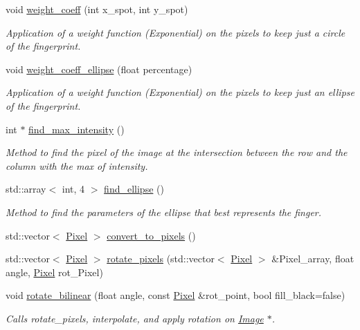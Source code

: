\begin{DoxyCompactItemize}
void \hyperlink{class_image_ae7249beaa8c989f37888ec3b2c444166}{weight\+\_\+coeff} (int x\+\_\+spot, int y\+\_\+spot)
\begin{DoxyCompactList}\small\item\em Application of a weight function (Exponential) on the pixels to keep just a circle of the fingerprint. \end{DoxyCompactList}\item 
void \hyperlink{class_image_a8d5d7d07ddaf59d0875b94e538f8429e}{weight\+\_\+coeff\+\_\+ellipse} (float percentage)
\begin{DoxyCompactList}\small\item\em Application of a weight function (Exponential) on the pixels to keep just an ellipse of the fingerprint. \end{DoxyCompactList}\item 
int $\ast$ \hyperlink{class_image_aebad8aed02315ffc5df4ec774b9b960d}{find\+\_\+max\+\_\+intensity} ()
\begin{DoxyCompactList}\small\item\em Method to find the pixel of the image at the intersection between the row and the column with the max of intensity. \end{DoxyCompactList}\item 
std\+::array$<$ int, 4 $>$ \hyperlink{class_image_aa85eb23026300e759e763ce312464632}{find\+\_\+ellipse} ()
\begin{DoxyCompactList}\small\item\em Method to find the parameters of the ellipse that best represents the finger. \end{DoxyCompactList}\item 
std\+::vector$<$ \hyperlink{class_pixel}{Pixel} $>$ \hyperlink{class_image_a04c8cb611e932e8b211fe9ca4473fe8c}{convert\+\_\+to\+\_\+pixels} ()
\item 
std\+::vector$<$ \hyperlink{class_pixel}{Pixel} $>$ \hyperlink{class_image_a1eaeac03912d7ec0e5a78e6e6035dc4f}{rotate\+\_\+pixels} (std\+::vector$<$ \hyperlink{class_pixel}{Pixel} $>$ \&Pixel\+\_\+array, float angle, \hyperlink{class_pixel}{Pixel} rot\+\_\+\+Pixel)
\item 
void \hyperlink{class_image_a64afdd661bf40ac0129227f8bf1daad1}{rotate\+\_\+bilinear} (float angle, const \hyperlink{class_pixel}{Pixel} \&rot\+\_\+point, bool fill\+\_\+black=false)
\begin{DoxyCompactList}\small\item\em Calls rotate\+\_\+pixels, interpolate, and apply rotation on \hyperlink{class_image}{Image} $\ast$. \end{DoxyCompactList}\item 

\end{DoxyCompactItemize}
